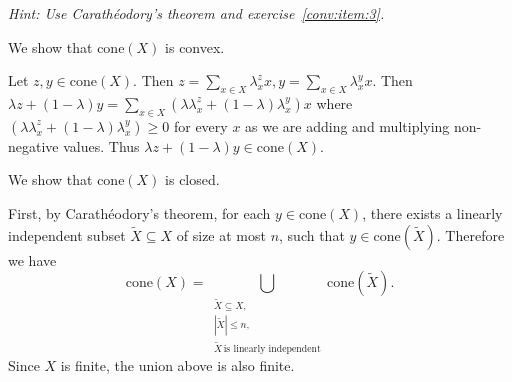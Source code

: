 \documentclass[11pt]{article}
\newcommand{\setR}{\mathbb{R}}
\renewcommand{\leq}{\leqslant}
\renewcommand{\geq}{\geqslant}
\newcommand{\cone}{\mathrm{cone}}
\begin{document}
\begin{enumerate}[1)]
  \emph{Hint: Use Carath\'eodory's theorem and exercise~\ref{conv:item:3}.}
  
  
  
  \begin{solution}
  We show that $\cone(X)$ is convex. 
  
  
  Let $z, y \in \cone(X)$. Then $z = \displaystyle\sum_{x \in X}\lambda_x^z x, y = \displaystyle\sum_{x \in X}\lambda_x^y x$. Then $\lambda z + (1-\lambda)y = \displaystyle\sum_{x \in X}(\lambda \lambda_x^z + (1-\lambda) \lambda_x^y) x$ where $(\lambda \lambda_x^z + (1-\lambda) \lambda_x^y) \geq 0$ for every $x$ as we are adding and multiplying non-negative values. Thus $\lambda z + (1-\lambda)y \in \cone(X)$. 
  
  
  We show that $\cone(X)$ is closed. 
  
  
  First, by Carath\'eodory's theorem, for each $y \in \cone(X)$, there exists a linearly independent subset $\tilde{X} \subseteq X$ of size at most $n$, such that $y \in \cone(\tilde{X})$. Therefore we have
  \[\cone(X) = \bigcup_{\substack{\tilde{X} \subseteq X, \\ |\tilde{X}| \leq n, \\ \tilde{X}\,\text{is linearly independent}}} \cone(\tilde{X}).\]
  Since $X$ is finite, the union above is also finite. 


\end{solution}
\end{enumerate}
\end{document}
